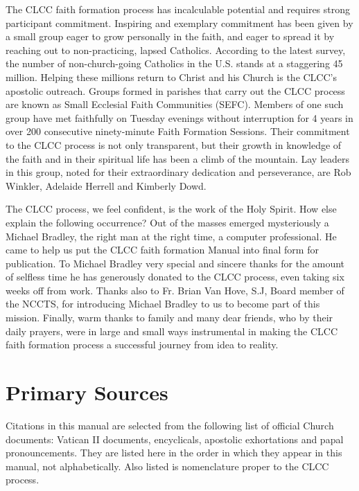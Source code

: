 \documentclass[oneside]{book}
\begin{document}
The CLCC faith formation process has incalculable potential and requires strong
participant commitment. Inspiring and exemplary commitment has been given by a
small group eager to grow personally in the faith, and eager to spread it by
reaching out to non-practicing, lapsed Catholics. According to the latest
survey, the number of non-church-going Catholics in the U.S. stands at a
staggering 45 million. Helping these millions return to Christ and his Church is
the CLCC's apostolic outreach. Groups formed in parishes that carry out the CLCC
process are known as Small Ecclesial Faith Communities (SEFC). Members of one
such group have met faithfully on Tuesday evenings without interruption for 4
years in over 200 consecutive ninety-minute Faith Formation Sessions. Their
commitment to the CLCC process is not only transparent, but their growth in
knowledge of the faith and in their spiritual life has been a climb of the
mountain. Lay leaders in this group, noted for their extraordinary dedication
and perseverance, are Rob Winkler, Adelaide Herrell and Kimberly Dowd.

The CLCC process, we feel confident, is the work of the Holy Spirit. How else
explain the following occurrence? Out of the masses emerged mysteriously a
Michael Bradley, the right man at the right time, a computer professional. He
came to help us put the CLCC faith formation Manual into final form for
publication. To Michael Bradley very special and sincere thanks for the amount
of selfless time he has generously donated to the CLCC process, even taking six
weeks off from work. Thanks also to Fr. Brian Van Hove, S.J, Board member of the
NCCTS, for introducing Michael Bradley to us to become part of this
mission. Finally, warm thanks to family and many dear friends, who by their
daily prayers, were in large and small ways instrumental in making the CLCC
faith formation process a successful journey from idea to reality.


\pagebreak
\tableofcontents


\chapter{Primary Sources}

Citations in this manual are selected from the following list of official Church
documents: Vatican II documents, encyclicals, apostolic exhortations and papal
pronouncements. They are listed here in the order in which they appear in this
manual, not alphabetically. Also listed is nomenclature proper to the CLCC
process.
\end{document}
